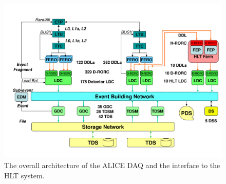 \begin{figure}[htbp]
\begin{center}
\includegraphics[width=14.cm]{./Version1/FigChapter4/FigureDAQ}
\caption{The overall architecture of the ALICE DAQ and the interface to the HLT system.}
\label{fig:daq}
\end{center}
\end{figure}

